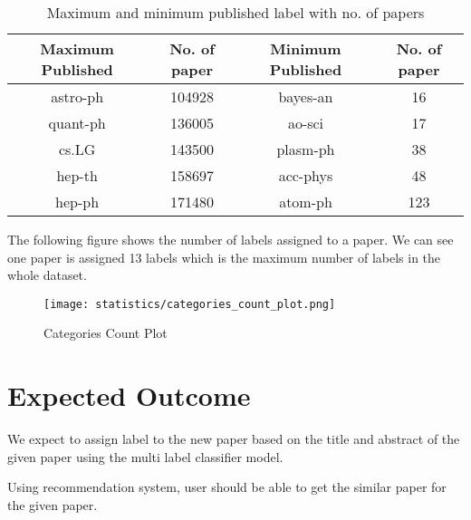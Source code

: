 \begin{table}[H]
    \centering
    \begin{tabular}{|c|c|c|c|}
    \hline
    Maximum Published & No. of paper & Minimum Published & No. of paper \\
    \hline
    astro-ph & 104928 & bayes-an & 16 \\
    \hline
    quant-ph & 136005 & ao-sci & 17 \\
    \hline
    cs.LG & 143500 & plasm-ph & 38 \\
    \hline
    hep-th & 158697 & acc-phys & 48 \\
    \hline
    hep-ph & 171480 & atom-ph & 123 \\
    \hline
    \end{tabular}
    \caption{Maximum and minimum published label with no. of papers }
    \label{table:1}
    \end{table}

The following figure shows the number of labels assigned to a paper. We can see one paper is assigned 13 labels which is the maximum number of labels in the whole dataset.
\begin{figure}[H]
    \centering
    \texttt{[image: statistics/categories\_count\_plot.png]}
    \caption{Categories Count Plot}
    \label{fig: Categories Count Plot}
\end{figure}




\section{Expected Outcome}
We expect to assign label to the new paper based on the title and abstract of the given paper using the multi label classifier model.

Using recommendation system, user should be able to get the similar paper for the given paper. 


